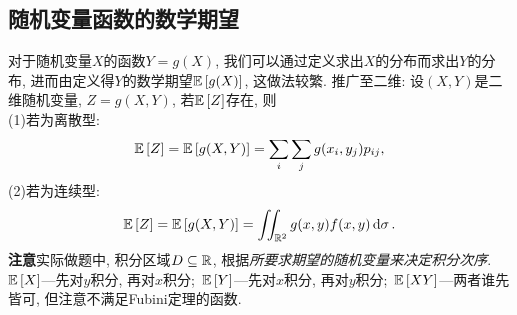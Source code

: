 \subsection{随机变量函数的数学期望}
对于随机变量$X$的函数$Y = g(X)$, 我们可以通过定义求出$X$的分布而求出$Y$的分布, 进而由定义得$Y$的数学期望$\EE{g(X)}$, 这做法较繁.\newpage
{}
推广至二维: 设$(X, Y)$是二维随机变量, $Z=g(X, Y)$, 若$\EE{Z}$存在, 则\\
(1)若为离散型:
\begin{equation}
    \EE{Z} = \EE{g(X, Y)} = \sum_{i}\sum_{j}g(x_i, y_j)p_{ij},
    \label{eq:4.5}
\end{equation}
(2)若为连续型:
\begin{equation}
    \EE{Z} = \EE{g(X, Y)} = \iint_{\RR[2]}g(x, y)f(x, y)\dd{\sigma}.
\end{equation}
\textbf{注意}\quad 实际做题中, 积分区域$D\subseteq \RR$, 根据\emph{\color{red}所要求期望的随机变量来决定积分次序}.\;\Eg\, $\EE{X}$---先对$y$积分, 再对$x$积分;\, $\EE{Y}$---先对$x$积分, 再对$y$积分;\, $\EE{XY}$---两者谁先皆可, 但注意不满足Fubini定理的函数.

